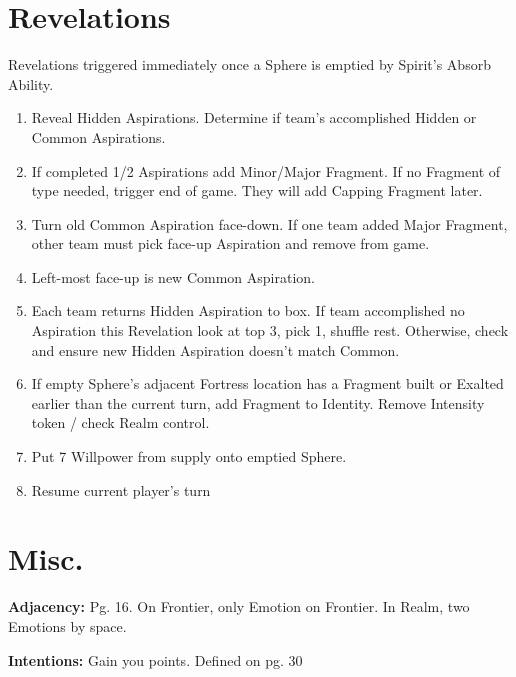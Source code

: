 \documentclass[10pt]{article}
\newenvironment{enumerateCustom}
{\begin{enumerate}
  \setlength{\itemsep}{1pt}
  \setlength{\parskip}{0pt}
  \setlength{\parsep}{0pt}}
{\end{enumerate}}
\begin{document}
\begin{multicols*}{2}
\section*{Revelations}
Revelations triggered immediately once a Sphere is emptied by Spirit's Absorb Ability.
\begin{enumerateCustom}
    \item Reveal Hidden Aspirations. Determine if team's accomplished Hidden or Common Aspirations.
    \item If completed 1/2 Aspirations add Minor/Major Fragment. If no Fragment of type needed, trigger end of game. They will add Capping Fragment later.
    \item Turn old Common Aspiration face-down. If one team added Major Fragment, other team must pick face-up Aspiration and remove from game.
    \item Left-most face-up is new Common Aspiration.
    \item Each team returns Hidden Aspiration to box. If team accomplished no Aspiration this Revelation look at top 3, pick 1, shuffle rest. Otherwise, check and ensure new Hidden Aspiration doesn't match Common.
    \item If empty Sphere's adjacent Fortress location has a Fragment built or Exalted earlier than the current turn, add Fragment to Identity. Remove Intensity token / check Realm control.
    \item Put 7 Willpower from supply onto emptied Sphere.
    \item Resume current player's turn
\end{enumerateCustom}

\section*{Misc.}
\textbf{Adjacency:} Pg. 16. On Frontier, only Emotion on Frontier. In Realm, two Emotions by space.

\textbf{Intentions:} Gain you points. Defined on pg. 30

\end{multicols*}
\end{document}
